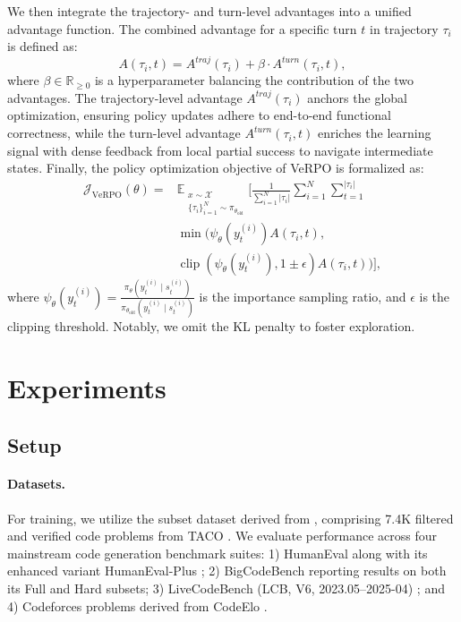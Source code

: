 \documentclass[11pt]{article}
\begin{document}
We then integrate the trajectory- and turn-level advantages into a unified advantage function. The combined advantage for a specific turn $t$ in trajectory $\tau_i$ is defined as:
\begin{equation}
A(\tau_i, t) = A^{traj}(\tau_i) + \beta \cdot A^{turn}(\tau_i, t),
\end{equation}
where $\beta \in \mathbb{R}_{\ge 0}$ is a hyperparameter balancing the contribution of the two advantages. The trajectory-level advantage $A^{traj}(\tau_i)$ anchors the global optimization, ensuring policy updates adhere to end-to-end functional correctness, while the turn-level advantage $A^{turn}(\tau_i, t)$ enriches the learning signal with dense feedback from local partial success to navigate intermediate states. Finally, the policy optimization objective of VeRPO is formalized as:
\begin{equation}
\begin{split}
  \mathcal{J}_{\text{VeRPO}}(\theta) = & \mathbb{E}_{\substack{x \sim \mathcal{X} \\ \{\tau_i\}_{i=1}^N \sim \pi_{\theta_{\text{old}}}}} \Biggl[ \frac{1}{\sum_{i=1}^N |\tau_{i}|} \sum_{i=1}^N \sum_{t=1}^{|\tau_i|} \\  
  &\min \Big( \psi_\theta(y_t^{(i)}) A(\tau_i, t), \\
  & \operatorname{clip}(\psi_\theta(y_t^{(i)}), 1\pm\epsilon) A(\tau_i, t) \Big) \Biggr],
\end{split}
\end{equation}
where $\psi_\theta(y_t^{(i)}) = \frac{\pi_\theta(y_t^{(i)} \mid s_t^{(i)})}{\pi_{\theta_{\text{old}}}(y_t^{(i)} \mid s_t^{(i)})}$ is the importance sampling ratio, and $\epsilon$ is the clipping threshold. Notably, we omit the KL penalty to foster exploration. %


\section{Experiments}

\subsection{Setup}

\paragraph{Datasets.}  For training, we utilize the subset dataset derived from \cite{luo2025deepcoder}, comprising 7.4K filtered and verified code problems from TACO \cite{li2023taco}. We evaluate performance across four mainstream code generation benchmark suites: 1) HumanEval \cite{chen2021humaneval} along with its enhanced variant HumanEval-Plus \cite{liu2023humanevalplus}; 2) BigCodeBench \cite{zhuo2024BigCodeBench} reporting results on both its Full and Hard subsets; 3)  LiveCodeBench (LCB, V6, 2023.05--2025-04) \cite{jain2024LiveCodeBench}; and 4) Codeforces problems derived from CodeElo \cite{quan2025codeelo}. 
\end{document}
